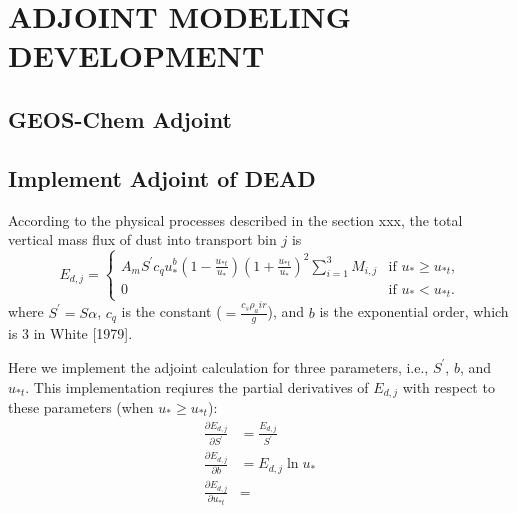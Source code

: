 \chapter{ADJOINT MODELING DEVELOPMENT}

\section{GEOS-Chem Adjoint}
\section{Implement Adjoint of DEAD}

   According to the physical processes described in the section xxx, the total
   vertical mass flux of dust into transport bin $j$ is 
   \begin{equation}
   E_{d,j} = 
     \begin{cases} A_m S^\prime c_q u_*^b\left(1-\frac{u_{*t}}{u_*}\right)
                   \left(1+\frac{u_{*t}}{u_*}\right)^2
                   \sum_{i=1}^3 M_{i,j} & \mbox{if $u_* \geq u_{*t}$,} \\
                   0 & \mbox{if $u_* < u_{*t}$.}
     \end{cases}
   \end{equation}
   where $S^\prime = S \alpha$, $c_q$ is the constant ($=\frac{c_s \rho_air}{g}$), 
   and $b$ is the exponential order, which is 3 in White [1979].

   Here we implement the adjoint calculation for three parameters, i.e., 
   $S^\prime$, $b$, and $u_{*t}$. This implementation reqiures the partial
   derivatives of $E_{d,j}$ with respect to these parameters (when 
   $u_* \geq u_{*t}$): 
   \begingroup
   \allowdisplaybreaks
   \begin{align}
     \frac{\partial E_{d,j}}{\partial S^\prime} &= \frac{E_{d,j}}{S^\prime} \\
     \frac{\partial E_{d,j}}{\partial b} &= E_{d,j} \ln{u_*} \\
     \frac{\partial E_{d,j}}{\partial u_{*t}}  & = 
   \end{align}
   \endgroup
